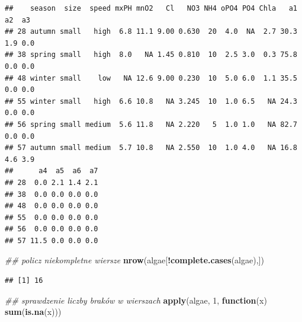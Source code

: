 \documentclass[]{book}
\newenvironment{Shaded}{\begin{snugshade}}{\end{snugshade}}
\newcommand{\CommentTok}[1]{\textcolor[rgb]{0.56,0.35,0.01}{\textit{#1}}}
\newcommand{\ControlFlowTok}[1]{\textcolor[rgb]{0.13,0.29,0.53}{\textbf{#1}}}
\newcommand{\DecValTok}[1]{\textcolor[rgb]{0.00,0.00,0.81}{#1}}
\newcommand{\KeywordTok}[1]{\textcolor[rgb]{0.13,0.29,0.53}{\textbf{#1}}}
\newcommand{\NormalTok}[1]{#1}
\newcommand{\OperatorTok}[1]{\textcolor[rgb]{0.81,0.36,0.00}{\textbf{#1}}}
\newcommand{\StringTok}[1]{\textcolor[rgb]{0.31,0.60,0.02}{#1}}
\theoremstyle{plain}
\theoremstyle{definition}
\begin{document}
\begin{Shaded}
\end{Shaded}

\begin{verbatim}
##    season  size  speed mxPH mnO2   Cl   NO3 NH4 oPO4 PO4 Chla   a1  a2  a3
## 28 autumn small   high  6.8 11.1 9.00 0.630  20  4.0  NA  2.7 30.3 1.9 0.0
## 38 spring small   high  8.0   NA 1.45 0.810  10  2.5 3.0  0.3 75.8 0.0 0.0
## 48 winter small    low   NA 12.6 9.00 0.230  10  5.0 6.0  1.1 35.5 0.0 0.0
## 55 winter small   high  6.6 10.8   NA 3.245  10  1.0 6.5   NA 24.3 0.0 0.0
## 56 spring small medium  5.6 11.8   NA 2.220   5  1.0 1.0   NA 82.7 0.0 0.0
## 57 autumn small medium  5.7 10.8   NA 2.550  10  1.0 4.0   NA 16.8 4.6 3.9
##      a4  a5  a6  a7
## 28  0.0 2.1 1.4 2.1
## 38  0.0 0.0 0.0 0.0
## 48  0.0 0.0 0.0 0.0
## 55  0.0 0.0 0.0 0.0
## 56  0.0 0.0 0.0 0.0
## 57 11.5 0.0 0.0 0.0
\end{verbatim}

\begin{Shaded}
\begin{Highlighting}[]
\CommentTok{## policz niekompletne wiersze}
\KeywordTok{nrow}\NormalTok{(algae[}\OperatorTok{!}\KeywordTok{complete.cases}\NormalTok{(algae),])}
\end{Highlighting}
\end{Shaded}

\begin{verbatim}
## [1] 16
\end{verbatim}

\begin{Shaded}
\begin{Highlighting}[]
\CommentTok{## sprawdzenie liczby braków w wierszach}
\KeywordTok{apply}\NormalTok{(algae, }\DecValTok{1}\NormalTok{, }\ControlFlowTok{function}\NormalTok{(x) }\KeywordTok{sum}\NormalTok{(}\KeywordTok{is.na}\NormalTok{(x)))}
\end{Highlighting}
\end{Shaded}
\end{document}
